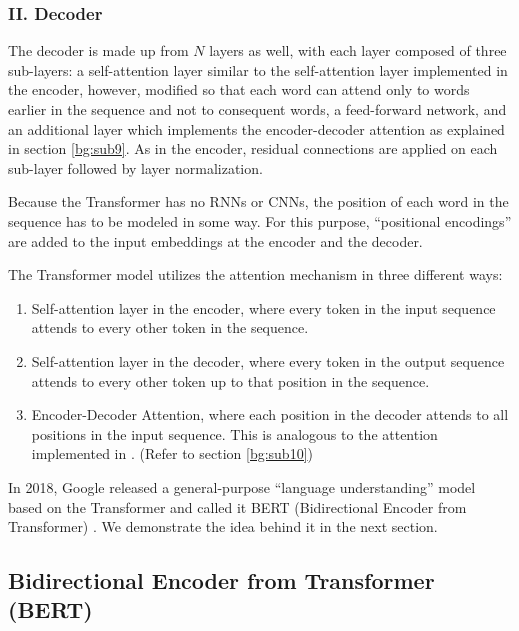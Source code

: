 

\subsubsection{II. Decoder} 
\label{bg:subsub13}

The decoder is made up from $N$ layers as well, with each layer composed of three sub-layers: a self-attention layer similar to the self-attention layer implemented in the encoder, however, modified so that each word can attend only to words earlier in the sequence and not to consequent words, a feed-forward network, and an additional layer which implements the encoder-decoder attention as explained in section \ref{bg:sub9}. As in the encoder, residual connections are applied on each sub-layer followed by layer normalization.


Because the Transformer has no \ac{RNN}s or \ac{CNN}s, the position of each word in the sequence has to be modeled in some way. For this purpose, \enquote{positional encodings} \cite{gehring2017convolutional} \cite{vaswani2017attention} are added to the input embeddings at the encoder and the decoder.


The Transformer model utilizes the attention mechanism in three different ways:
\begin{enumerate}
	\item Self-attention layer in the encoder, where every token in the input sequence attends to every other token in the sequence.
	\item Self-attention layer in the decoder, where every token in the output sequence attends to every other token up to that position in the sequence.
	\item Encoder-Decoder Attention, where each position in the decoder attends to all positions in the input sequence. This is analogous to the attention implemented in \cite{bahdanau2014neural}. (Refer to section \ref{bg:sub10})
\end{enumerate}


In 2018, Google released a general-purpose \enquote{language understanding} model based on the Transformer and called it \ac{BERT} (Bidirectional Encoder from Transformer) \cite{devlin2018bert}. We demonstrate the idea behind it in the next section.

\subsection{Bidirectional Encoder from Transformer (BERT)} 
\label{bg:sub13}

